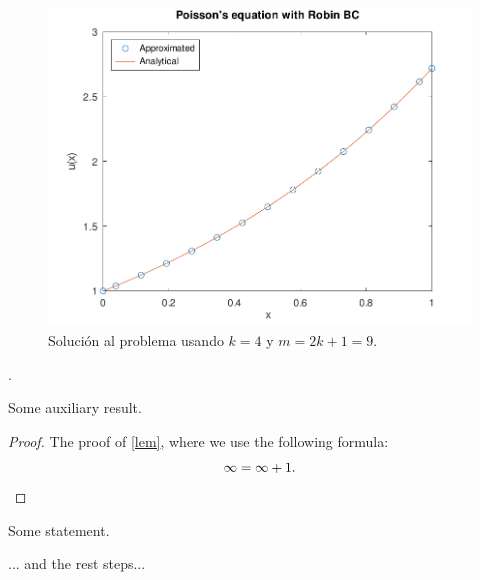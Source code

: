 \begin{problem}
\begin{figure}[ht!]
    \centering
    \includegraphics[width=.6\paperwidth]{../examples/octave/elliptic1D.pdf}
    \caption{Solución al problema usando $k=4$ y $m=2k+1=9$.}
\end{figure}

\noQED %
\end{problem}

\begin{problem}
.
\end{problem}

\begin{solution}
    \begin{lemma}\label{lem}
        Some auxiliary result.
    \end{lemma}
    \begin{proof}
        The proof of \cref{lem}, where we use the following formula:
        \[
            \infty = \infty + 1.
            \qedhere %
        \]
    \end{proof}
    \begin{fact}
        \proofless %
        Some statement.
    \end{fact}
    ... and the rest steps...

\end{solution}